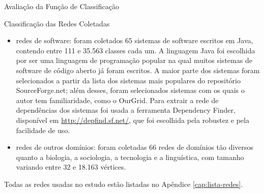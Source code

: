 \begin{section}{Avaliação da Função de Classificação}
\begin{subsection}{Classificação das Redes Coletadas}
	
	

\end{subsection}


% 
% 

\begin{itemize}
	\item redes de software: foram coletados 65 sistemas de software escritos em Java, contendo entre 111 e 35.563 classes cada um. A linguagem Java foi escolhida por ser uma linguagem de programação popular na qual muitos sistemas de software de código aberto já foram escritos. A maior parte dos sistemas foram selecionados a partir da lista dos sistemas mais populares do repositório SourceForge.net; além desses, foram selecionados sistemas com os quais o autor tem familiaridade, como o OurGrid. Para extrair a rede de dependências dos sistemas foi usada a ferramenta Dependency Finder, disponível em \url{http://depfind.sf.net/}, que foi escolhida pela robustez e pela facilidade de uso.
	\item redes de outros domínios: foram coletadas 66 redes de domínios tão diversos quanto a biologia, a sociologia, a tecnologia e a linguística, com tamanho variando entre 32 e 18.163 vértices.
\end{itemize}

Todas as redes usadas no estudo estão listadas no Apêndice \ref{cap:lista-redes}.

\end{section}


